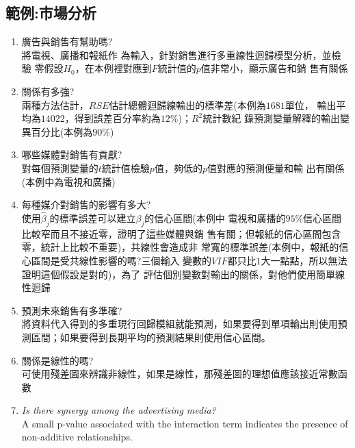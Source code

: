 \documentclass{report} %
\begin{document}
    \subsection{範例:市場分析}
      \begin{enumerate}
      	\item 廣告與銷售有幫助嗎? \\
          將{\color{red}電視}、{\color{red}廣播}和{\color{red}報紙}作
            為輸入，針對{\color{blue}銷售}進行多重線性迴歸模型分析，並檢驗
            零假設$H_0$，在本例裡對應到$F$統計值的$p$值非常小，顯示廣告和銷
            售有關係
	    \item 關係有多強? \\
          兩種方法估計，$RSE$估計總體迴歸線輸出的標準差(本例為$1681$單位，
            輸出平均為$14022$，得到誤差百分率約為$12\%$)；$R ^ 2$統計數紀
            錄預測變量解釋的輸出變異百分比(本例為$90\%$)
        \item 哪些媒體對銷售有貢獻? \\
          對每個預測變量的$t$統計值檢驗$p$值，夠低的$p$值對應的預測便量和輸
            出有關係(本例中為電視和廣播)
      	\item 每種媒介對銷售的影響有多大? \\
          使用$\hat{\beta}_j$的標準誤差可以建立$\beta_j$的信心區間(本例中
            電視和廣播的$95\%$信心區間比較窄而且不接近零，證明了這些媒體與銷
            售有關；但報紙的信心區間包含零，統計上比較不重要)，共線性會造成非
            常寬的標準誤差(本例中，報紙的信心區間是受共線性影響的嗎?三個輸入
            變數的$VIF$都只比$1$大一點點，所以無法證明這個假設是對的)，為了
            評估個別變數對輸出的關係，對他們使用簡單線性迴歸
      	\item 預測未來銷售有多準確? \\
          將資料代入得到的多重現行回歸模組就能預測，如果要得到單項輸出則使用預
          測區間；如果要得到長期平均的預測結果則使用信心區間。
      	\item 關係是線性的嗎? \\
          可使用殘差圖來辨識非線性，如果是線性，那殘差圖的理想值應該接近常數函
          數
        \item {\it Is there synergy among the advertising media?}
          \\
          A small p-value associated with the interaction term
            indicates the presence of non-additive relationships.
      \end{enumerate}
\end{document}
